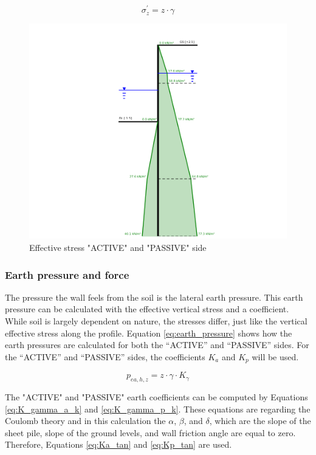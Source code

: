 \begin{equation}
    \sigma^{'}_{z} = z \cdot \gamma
    \label{eq:effective_stress}
\end{equation}

\begin{figure}[H]
    \centering
    \includegraphics[width=0.7\linewidth]{figures/ch8/effective_stress.png}
    \caption{Effective stress "ACTIVE" and "PASSIVE" side}
    \label{fig:effective_stress}
\end{figure}

\subsubsection{Earth pressure and force}

The pressure the wall feels from the soil is the lateral earth pressure. This earth pressure can be calculated with the effective vertical stress and a coefficient. While soil is largely dependent on nature, the stresses differ, just like the vertical effective stress along the profile. Equation \ref{eq:earth_pressure} shows how the earth pressures are calculated for both the “ACTIVE” and “PASSIVE” sides. For the “ACTIVE” and “PASSIVE” sides, the coefficients $K_{a}$ and $K_{p}$ will be used.

\begin{equation}
    p_{ea,h,z} = z \cdot \gamma \cdot K_{\gamma}
    \label{eq:earth_pressure}
\end{equation}

The "ACTIVE" and "PASSIVE" earth coefficients can be computed by Equations \ref{eq:K_gamma_a_k} and \ref{eq:K_gamma_p_k}. These equations are regarding the Coulomb theory and in this calculation the $\alpha$, $\beta$, and $\delta$, which are the slope of the sheet pile, slope of the ground levels, and wall friction angle are equal to zero. Therefore, Equations \ref{eq:Ka_tan} and \ref{eq:Kp_tan} are used.

